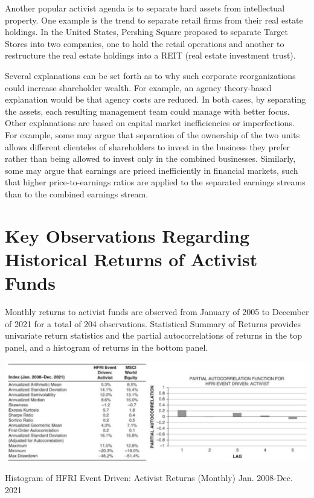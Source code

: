 \documentclass[11pt]{article}
\begin{document}
Another popular activist agenda is to separate hard assets from intellectual property. One example is the trend to separate retail firms from their real estate holdings. In the United States, Pershing Square proposed to separate Target Stores into two companies, one to hold the retail operations and another to restructure the real estate holdings into a REIT (real estate investment trust).

Several explanations can be set forth as to why such corporate reorganizations could increase shareholder wealth. For example, an agency theory-based explanation would be that agency costs are reduced. In both cases, by separating the assets, each resulting management team could manage with better focus. Other explanations are based on capital market inefficiencies or imperfections. For example, some may argue that separation of the ownership of the two units allows different clienteles of shareholders to invest in the business they prefer rather than being allowed to invest only in the combined businesses. Similarly, some may argue that earnings are priced inefficiently in financial markets, such that higher price-to-earnings ratios are applied to the separated earnings streams than to the combined earnings stream.

\section*{Key Observations Regarding Historical Returns of Activist Funds}
Monthly returns to activist funds are observed from January of 2005 to December of 2021 for a total of 204 observations. Statistical Summary of Returns provides univariate return statistics and the partial autocorrelations of returns in the top panel, and a histogram of returns in the bottom panel.

\begin{center}
\includegraphics[max width=\textwidth]{2024_04_09_7a731eb4be7055a19322g-7(1)}
\end{center}

Histogram of HFRI Event Driven: Activist Returns (Monthly) Jan. 2008-Dec. 2021
\end{document}
